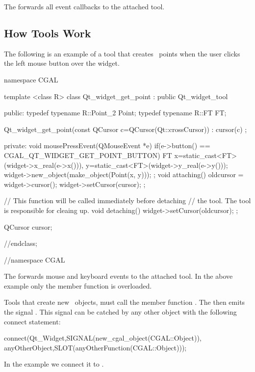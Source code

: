 The  forwards all event callbacks to the attached tool.


\subsection{How Tools Work}

The following is an example of a tool that creates \cgal\ points when the user 
clicks the left mouse button over the widget. 
 
\begin{ccExampleCode}
namespace CGAL {

template <class R>
class Qt_widget_get_point : public Qt_widget_tool
{
public:
  typedef typename R::Point_2   Point;
  typedef typename R::FT        FT;
  
  Qt_widget_get_point(const QCursor c=QCursor(Qt::crossCursor)) :
    cursor(c) {};
  
private:
  void mousePressEvent(QMouseEvent *e)
  {
    if(e->button() == CGAL_QT_WIDGET_GET_POINT_BUTTON)
    {
      FT
        x=static_cast<FT>(widget->x_real(e->x())),
        y=static_cast<FT>(widget->y_real(e->y()));
      widget->new_object(make_object(Point(x, y)));
    }
  };
  void attaching()
  {
    oldcursor = widget->cursor();
    widget->setCursor(cursor);
  };
  
  // This function will be called immediately before detaching
  // the tool. The tool is responsible for cleaing up.
  void detaching()
  {
    widget->setCursor(oldcursor);
  };

  QCursor cursor;
}//endclass;
}//namespace CGAL
\end{ccExampleCode}

The  forwards mouse and keyboard events to the attached tool.
In the above example only the  member function is overloaded.

Tools that create new \cgal\ objects, must call the member 
function . The  
then emits the signal . This signal can be 
catched by any other object with the following connect statement:

\begin{ccExampleCode}
connect(Qt_Widget,SIGNAL(new_cgal_object(CGAL::Object)),
        anyOtherObject,SLOT(anyOtherFunction(CGAL::Object)));
\end{ccExampleCode}

In the example we connect it to .

